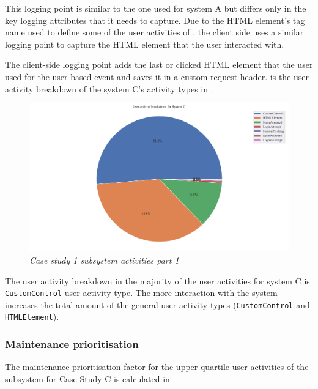 This logging point is similar to the one used for system A but differs only in the key logging attributes that it needs to capture. Due to the HTML element's tag name used to define some of the user activities of , the client side uses a similar logging point to capture the HTML element that the user interacted with.\par The client-side logging point adds the last or clicked HTML element that the user used for the user-based event and saves it in a custom request header.  is the user activity breakdown of the system C's activity types in .

\begin{figure}[!htb]
	\centering %
	\includegraphics[width=0.95\linewidth]{img/ch3/analysis/case_C_breakdown.pdf}
	\caption[Case study 1 subsystem activities part 1]
	{\textit{Case study 1 subsystem activities part 1}}\label{fig:ch3_caseCBreakdown}
\end{figure}

\clearpage

The user activity breakdown in  the majority of the user activities for system C is \texttt{CustomControl} user activity type. The more interaction with the system increases the total amount of the general user activity types (\texttt{CustomControl} and \texttt{HTMLElement}).

\subsubsection{Maintenance prioritisation}
The maintenance prioritisation factor for the upper quartile user activities of the subsystem for Case Study C is calculated in .

